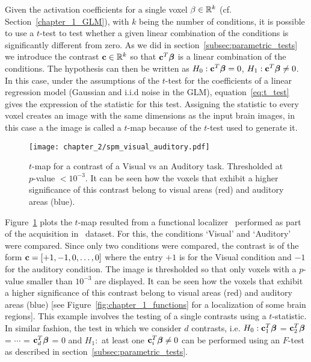 Given the activation coefficients for a single voxel $\beta \in {\mathbb R}^k$ (cf. Section~\ref{chapter_1_GLM}), with $k$ being the number of conditions, it is possible to use a $t$-test to test whether  a given linear combination of the conditions is significantly different from zero. As we did in section~\ref{subsec:parametric_tests} we introduce the contrast $\mathbf{c}\in {\mathbb R}^k$ so that $\mathbf{c}^T {\boldsymbol \beta}$ is a linear combination of the conditions. The hypothesis can then be written as $H_0: \mathbf{c}^T {\boldsymbol \beta} = 0$, $H_1: \mathbf{c}^T {\boldsymbol \beta} \neq 0$. In this case, under the assumptions of the $t$-test for the coefficients of a linear regression model (Gaussian and i.i.d noise in the \gls{GLM}), equation~\ref{eq:t_test} gives the expression of the statistic for this test. Assigning the statistic to every voxel creates an image with the same dimensions as the input brain images, in this case a the image is called a $t$-map because of the $t$-test used to generate it.


\begin{figure}
\begin{center}
\texttt{[image: chapter\_2/spm\_visual\_auditory.pdf]}
\end{center}
\caption{$t$-map for a contrast of a Visual vs an Auditory task. Thresholded at $p$-value $< 10 ^ {-3}$. It can be seen how the voxels that exhibit a higher significance of this contrast belong to visual areas (red) and auditory areas (blue).}\label{fig:t_test_localizer}
\end{figure}


Figure~\ref{fig:t_test_localizer} plots the $t$-map resulted from a functional localizer~\citep{pinel2007fast} performed as part of the acquisition in~\citet{borghesani:hal-00986606} dataset. For this, the conditions `Visual' and `Auditory' were compared. Since only two conditions were compared, the contrast is of the form $\mathbf{c} = [+1, -1, 0, \ldots, 0]$ where the entry $+1$ is for the Visual condition and $-1$ for the auditory condition. The image is thresholded so that only voxels with a $p$-value smaller than $10^ {-3}$ are displayed. It can be seen how the voxels that exhibit a higher significance of this contrast belong to visual areas (red) and auditory areas (blue) [see Figure~\ref{fig:chapter_1_functions} for a localization of some brain regions]. This example involves the testing of a single contrasts using a $t$-statistic. In similar fashion, the test in which we consider $d$ contrasts, i.e. $H_0: \mathbf{c}_1^T {\boldsymbol \beta}$ = $\mathbf{c}_2^T {\boldsymbol \beta}$ = $\cdots$ = $\mathbf{c}_d^T {\boldsymbol \beta}$ = 0 and $H_1:$ at least one $\mathbf{c}_i^T{\boldsymbol \beta} \neq 0$ can be performed using an $F$-test as described in section~\ref{subsec:parametric_tests}.



